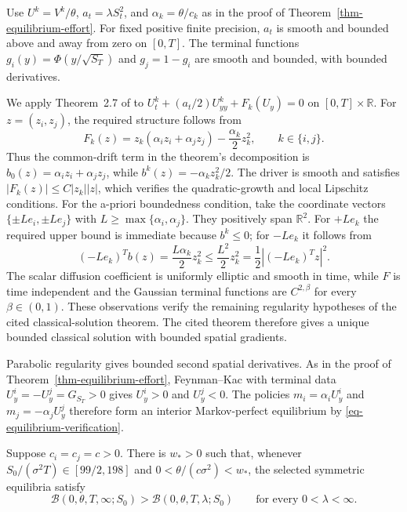 \documentclass[mnsc]{informs3}
\begin{document}
\begin{APPENDICES}
{
Use $U^k=V^k/\theta$, $a_t=\lambda S_t^2$, and
$\alpha_k=\theta/c_k$ as in the proof of
Theorem~\ref{thm-equilibrium-effort}. For fixed positive finite precision,
$a_t$ is smooth and bounded above and away from zero on $[0,T]$.
The terminal functions $g_i(y)=\Phi(y/\sqrt{S_T})$ and $g_j=1-g_i$
are smooth and bounded, with bounded derivatives.

We apply Theorem~2.7 of \citet{Jackson2024Quadratic} to
$U_t^k+(a_t/2)U_{yy}^k+F_k(U_y)=0$ on $[0,T]\times\mathbb R$.
For $z=(z_i,z_j)$, the required structure follows from
\[
F_k(z)=z_k(\alpha_i z_i+\alpha_j z_j)
-\frac{\alpha_k}{2}z_k^2,\qquad k\in\{i,j\}.
\]
Thus the common-drift term in the theorem's decomposition is
$b_0(z)=\alpha_i z_i+\alpha_j z_j$, while
$b^k(z)=-\alpha_kz_k^2/2$. The driver is smooth and satisfies
$|F_k(z)|\leq C|z_k||z|$, which verifies the quadratic-growth and local
Lipschitz conditions. For the a-priori boundedness condition, take the
coordinate vectors $\{\pm L e_i,\pm L e_j\}$ with
$L\geq\max\{\alpha_i,\alpha_j\}$. They positively span $\mathbb R^2$.
For $+Le_k$ the required upper bound is immediate because $b^k\leq0$;
for $-Le_k$ it follows from
\[
(-Le_k)^Tb(z)=\frac{L\alpha_k}{2}z_k^2
\leq\frac{L^2}{2}z_k^2
=\frac12|(-Le_k)^Tz|^2.
\]
The scalar diffusion coefficient is uniformly elliptic and smooth in
time, while $F$ is time independent and the Gaussian terminal functions
are $C^{2,\beta}$ for every $\beta\in(0,1)$. These observations verify the
remaining regularity hypotheses of the cited classical-solution theorem.
The cited theorem therefore gives a unique bounded classical solution with
bounded spatial gradients.

Parabolic regularity gives bounded second spatial derivatives.
As in the proof of Theorem~\ref{thm-equilibrium-effort},
Feynman--Kac with terminal data $U_y^i=-U_y^j=G_{S_T}>0$ gives
$U_y^i>0$ and $U_y^j<0$. The policies $m_i=\alpha_iU_y^i$ and
$m_j=-\alpha_jU_y^j$ therefore form an interior Markov-perfect
equilibrium by \eqref{eq-equilibrium-verification}.
\Halmos
\endproof
}

{
\begin{lemma}\label{lem-design-weak-precision}
Suppose $c_i=c_j=c>0$. There is $w_*>0$ such that, whenever
$S_0/(\sigma^2T)\in[99/2,198]$ and $0<\theta/(c\sigma^2)<w_*$,
the selected symmetric equilibria satisfy
\begin{equation}\label{eq-design-uniform-weak-ranking}
\mathcal B(0,\theta,T,\infty;S_0)>
\mathcal B(0,\theta,T,\lambda;S_0)
\qquad\text{for every }0<\lambda<\infty.
\end{equation}
\end{lemma}

}
\end{APPENDICES}
\end{document}
